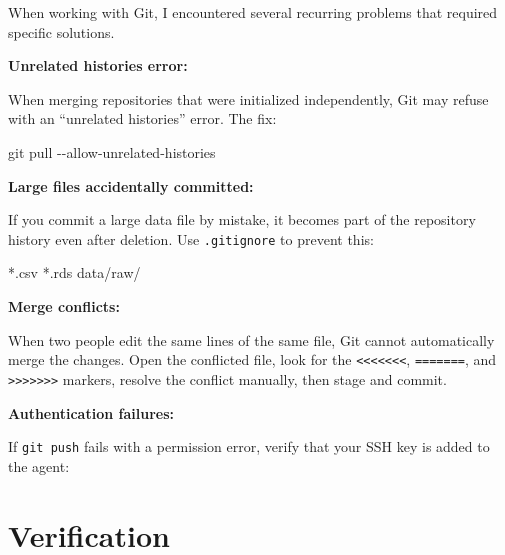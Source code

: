 \documentclass[
  letterpaper,
  DIV=11,
  numbers=noendperiod]{scrartcl}
\newenvironment{Shaded}{\begin{snugshade}}{\end{snugshade}}
\newcommand{\AttributeTok}[1]{\textcolor[rgb]{0.40,0.45,0.13}{#1}}
\newcommand{\BuiltInTok}[1]{\textcolor[rgb]{0.00,0.23,0.31}{#1}}
\newcommand{\ExtensionTok}[1]{\textcolor[rgb]{0.00,0.23,0.31}{#1}}
\newcommand{\FunctionTok}[1]{\textcolor[rgb]{0.28,0.35,0.67}{#1}}
\newcommand{\NormalTok}[1]{\textcolor[rgb]{0.00,0.23,0.31}{#1}}
\newcommand{\StringTok}[1]{\textcolor[rgb]{0.13,0.47,0.30}{#1}}
\newcommand{\VariableTok}[1]{\textcolor[rgb]{0.07,0.07,0.07}{#1}}
\begin{document}
When working with Git, I encountered several recurring problems that
required specific solutions.

\textbf{Unrelated histories error:}

When merging repositories that were initialized independently, Git may
refuse with an ``unrelated histories'' error. The fix:

\begin{Shaded}
\begin{Highlighting}[]
\FunctionTok{git}\NormalTok{ pull }\AttributeTok{{-}{-}allow{-}unrelated{-}histories}
\end{Highlighting}
\end{Shaded}

\textbf{Large files accidentally committed:}

If you commit a large data file by mistake, it becomes part of the
repository history even after deletion. Use \texttt{.gitignore} to
prevent this:

\begin{Shaded}
\begin{Highlighting}[]
\ExtensionTok{*.csv}
\ExtensionTok{*.rds}
\ExtensionTok{data/raw/}
\end{Highlighting}
\end{Shaded}

\textbf{Merge conflicts:}

When two people edit the same lines of the same file, Git cannot
automatically merge the changes. Open the conflicted file, look for the
\texttt{\textless{}\textless{}\textless{}\textless{}\textless{}\textless{}\textless{}},
\texttt{=======}, and
\texttt{\textgreater{}\textgreater{}\textgreater{}\textgreater{}\textgreater{}\textgreater{}\textgreater{}}
markers, resolve the conflict manually, then stage and commit.

\textbf{Authentication failures:}

If \texttt{git\ push} fails with a permission error, verify that your
SSH key is added to the agent:

\begin{Shaded}
\end{Shaded}

\section{Verification}\label{verification}
\end{document}
